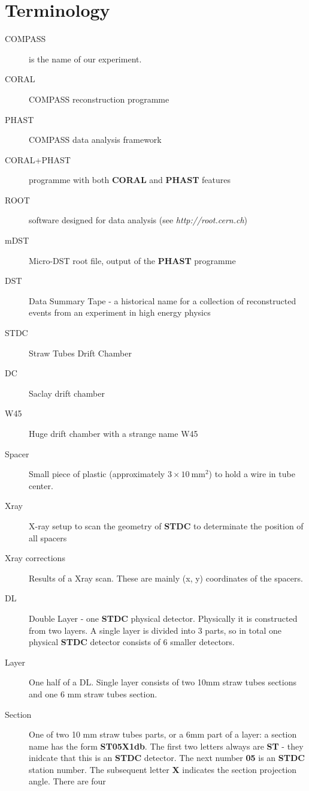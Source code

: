\documentclass[a4paper,12pt]{article}
\begin{document}
\section{Terminology}
\begin{description}
\item[COMPASS] is the name of our experiment.
\item[CORAL] COMPASS reconstruction programme
\item[PHAST] COMPASS data analysis framework
\item[CORAL+PHAST] programme with both {\bf CORAL} and {\bf PHAST} features
\item[ROOT] software designed for data analysis (see {\it http://root.cern.ch})
\item[mDST] Micro-DST root file, output of the {\bf PHAST} programme
\item[DST] Data Summary Tape - a historical name for a collection of
      reconstructed events from an experiment in high energy physics
\item[STDC] Straw Tubes Drift Chamber
\item[DC] Saclay drift chamber
\item[W45] Huge drift chamber with a strange name W45
\item[Spacer] Small piece of plastic (approximately $3 \times 10~\mathrm{mm}^2$) to hold a wire
      in tube center.
\item[Xray] X-ray setup to scan the geometry of {\bf STDC} to determinate
        the position of all spacers
\item[Xray corrections] Results of a Xray scan. These are mainly
        (x, y) coordinates of the spacers.
\item[DL] Double Layer - one {\bf STDC} physical detector. Physically it is
        constructed from two layers. A single layer is divided into 3 parts,
        so in total one physical {\bf STDC} detector consists of 6 smaller
        detectors.
\item[Layer] One half of a DL. Single layer consists of two 10mm
        straw tubes sections and one 6 mm straw tubes section.
\item[Section] One of two 10 mm straw tubes parts, or a 6mm part of
        a layer: a section name has the form {\bf ST05X1db}. The first two
        letters always are {\bf ST} - they inidcate that this is an {\bf STDC}
        detector. The next number {\bf 05} is an {\bf STDC} station number.
        The subsequent letter {\bf X} indicates the section projection angle. There are four

\end{description}
\end{document}
